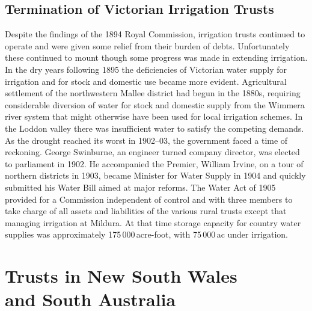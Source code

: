 \subsection*{Termination of Victorian Irrigation Trusts}

Despite the findings of the 1894 Royal Commission, irrigation trusts
continued to operate and were given some relief from their burden of
debts.  Unfortunately these continued to mount though some progress
was made in extending irrigation.  In the dry years following 1895 the
deficiencies of Victorian water supply for irrigation and for stock
and domestic use became more evident.  Agricultural settlement of the
northwestern Mallee district had begun in the 1880s, requiring
considerable diversion of water for stock and domestic supply from the
Wimmera river system that might otherwise have been used for local
irrigation schemes.  In the Loddon valley there was insufficient water
to satisfy the competing demands.  As the drought reached its worst in
1902--03, the government faced a time of reckoning.  George Swinburne,
an engineer turned company director, was elected to parliament in
1902.  He accompanied the Premier, William Irvine, on a tour of
northern districts in 1903, became Minister for Water Supply in 1904
and quickly submitted his Water Bill aimed at major reforms.  The
Water Act of 1905 provided for a Commission independent of control and
with three members to take charge of all assets and liabilities of the
various rural trusts except that managing irrigation at Mildura.  At
that time storage capacity for country water supplies was
approximately 175\,000\,acre-foot, with 75\,000\,ac under
irrigation.

\section*{Trusts in New South Wales\\ and South Australia}

